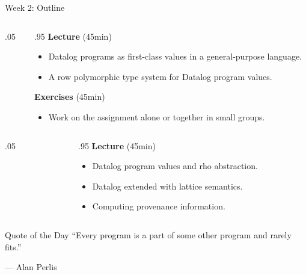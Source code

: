 \begin{frame}[standout]
\end{frame}

\begin{frame}{Week 2: Outline}
\color{gray}
\begin{columns}
\begin{column}{.05\textwidth}
\end{column}
\begin{column}{.95\textwidth}
    \footnotesize
\textbf{Lecture} (45min)  \vspace{-2mm}
\begin{itemize}
    \color{gray}
    \setlength\itemsep{-0.5em}
    \item Datalog programs as first-class values in a general-purpose language.
    \item A row polymorphic type system for Datalog program values.
\end{itemize}
\textbf{Exercises} (45min) \vspace{-2mm}
\begin{itemize}
    \color{gray}
    \item Work on the assignment alone or together in small groups.
\end{itemize}
\end{column}
\end{columns}

\medskip
\medskip
\medskip

\color{black}
\begin{columns}
\begin{column}{.05\textwidth}
\end{column}
\begin{column}{.95\textwidth}
\footnotesize
\textbf{Lecture} (45min) \vspace{-2mm}
\begin{itemize}
    \setlength\itemsep{-0.5em}
    \item Datalog program values and rho abstraction.
    \item Datalog extended with lattice semantics.
    \item Computing provenance information.
\end{itemize}
\end{column}
\end{columns}
\end{frame}

\begin{frame}{Quote of the Day}
``Every program is a part of some other program and rarely fits.''

\begin{flushright}
--- Alan Perlis
\end{flushright}
\end{frame}

